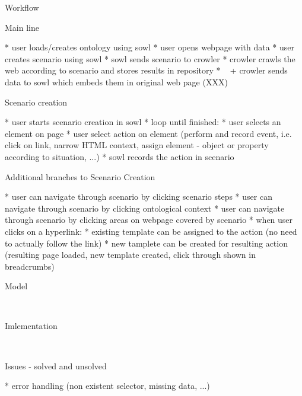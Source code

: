 \sec Workflow

\secc Main line

\begitems
  * user loads/creates ontology using sowl
  * user opens webpage with data
  * user creates scenario using sowl
  * sowl sends scenario to crowler
  * crowler crawls the web according to scenario and stores results in repository
  * ~ + crowler sends data to sowl which embeds them in original web page (XXX)
\enditems


\secc Scenario creation

\begitems
  * user starts scenario creation in sowl
  * loop until finished:
  \begitems
    * user selects an element on page
    * user select action on element (perform and record event, i.e. click on link, narrow HTML context, assign element - object or property according to situation, ...)
    * sowl records the action in scenario
  \enditems
\enditems


\secc Additional branches to Scenario Creation

\begitems
  * user can navigate through scenario by clicking scenario steps
  * user can navigate through scenario by clicking ontological context
  * user can navigate through scenario by clicking areas on webpage covered by scenario
  * when user clicks on a hyperlink: 
  \begitems
    * existing template can be assigned to the action (no need to actually follow the link)
    * new tamplete can be created for resulting action (resulting page loaded, new template created, click through shown in breadcrumbs)
  \enditems
\enditems



\sec Model

~


\sec Imlementation

~


\sec Issues - solved and unsolved

\begitems
  * error handling (non existent selector, missing data, ...)
\enditems





